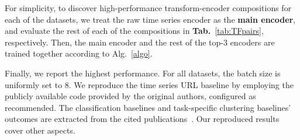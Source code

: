 For simplicity, to discover high-performance transform-encoder compositions for each of the datasets, we treat the raw time series encoder as the \textbf{main encoder}, and evaluate the rest of each of the compositions in \textbf{Tab.}~\ref{tab:TFpairs}, respectively. Then, the main encoder and the rest of the top-3 encoders are trained together according to Alg.~\ref{algo}. 

Finally, we report the highest performance. For all datasets, the batch size is uniformly set to 8. We reproduce the time series URL baseline by employing the publicly available code provided by the original authors, configured as recommended. The classification baselines and task-specific clustering baselines' outcomes are extracted from the cited publications~\cite{bagnall2018uea, li2021shapenet, tang2020omni, xiao2022dynamic, yue2022ts2vec, zhang2022multiview}. Our reproduced results cover other aspects.


